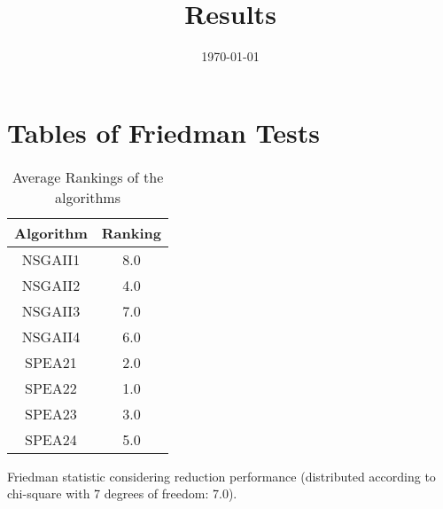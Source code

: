 \documentclass{article}
\title{Results}
\author{}
\date{\today}
\begin{document}
\oddsidemargin 0in \topmargin 0in\maketitle
\section{Tables of Friedman Tests}
\begin{table}[!htp]
\centering
\caption{Average Rankings of the algorithms
}\begin{tabular}{c|c}
Algorithm&Ranking\\
\hline
NSGAII1&8.0\\
NSGAII2&4.0\\
NSGAII3&7.0\\
NSGAII4&6.0\\
SPEA21&2.0\\
SPEA22&1.0\\
SPEA23&3.0\\
SPEA24&5.0\\
\end{tabular}
\end{table}


Friedman statistic considering reduction performance (distributed according to chi-square with 7 degrees of freedom: 7.0).
\end{document}
